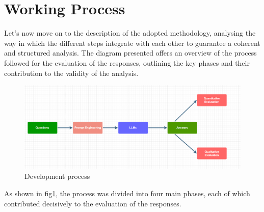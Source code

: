 \section{Working Process}
Let's now move on to the description of the adopted methodology, analysing the way in which the different steps integrate with each other to guarantee a coherent and structured analysis. The diagram presented offers an overview of the process followed for the evaluation of the responses, outlining the key phases and their contribution to the validity of the analysis.
\begin{figure}[h]
    \centering
    \includegraphics[width=0.7\linewidth]{Figures/Process.png}
    \caption{Development process}
    \label{fig:developement}
\end{figure}
As shown in fig\ref{fig:developement}, the process was divided into four main phases, each of which contributed decisively to the evaluation of the responses.
